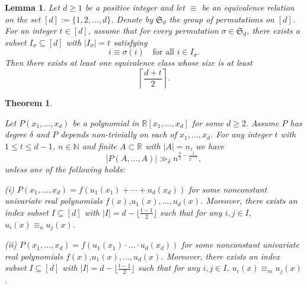 \documentclass[10pt,a4paper]{amsart}
\newtheorem{theorem}{Theorem}
\newtheorem{lemma}{Lemma}
\begin{document}
\begin{lemma}\label{lem:counting}
Let $d\geq 1$ be a positive integer and let $\equiv$ be an equivalence relation on the set $[d] := \{1,2,\dots,d\}$.
Denote by $\mathfrak{S}_d$ the group of permutations on $[d]$.
For an integer $t\in [d]$, assume that for every permutation $\sigma \in \mathfrak{S}_d$, there exists a subset
$I_{\sigma}\subseteq [d]$ with $|I_{\sigma}|=t$ satisfying
\[
i\equiv \sigma(i) \quad \text{for all } i\in I_{\sigma}.
\]
Then there exists at least one equivalence class whose size is at least
\[
\left\lceil \frac{d+t}{2} \right\rceil.
\]
\end{lemma}

\begin{theorem}\label{thm:main1} 

Let $P(x_{1},\ldots,x_{d})$ be a polynomial in $ \mathbb{R}[x_{1},\ldots,x_{d}]$  for some $d\geq 2.$ Assume $P$ has degree $ \delta $ and $P$ depends non-trivially on each of $x_1,...,x_d$.  For any integer $t$ with $1\leq t\leq d-1$, $n \in \mathbb{N}$ and finite $A\subset \mathbb{R}$ with $|A|=n$, we have
$$
| P(A,\ldots, A)|\gg_{\delta} n^{\frac{3}{2}-\frac{1}{2^{t+1}}},
$$
unless one of the following holds:

(i) $P(x_{1},\ldots,x_{d})=f( u_{1}(x_{1})+\cdots +u_{d}(x_{d}))$ for some nonconstant univariate real polynomials  $f(x)$,$u_1(x),\ldots,u_{d}(x)$. 
Moreover, there exists an index subset $I\subseteq [d]$ with $|I|=d-\lfloor \frac{t-1}{2} \rfloor$ such that for any $i,j\in I$,  $u_{i}(x)\equiv_{a} u_{j}(x)$.



(ii) $P(x_{1},\ldots,x_{d})=f( u_{1}(x_{1})\cdot\ldots\cdot u_{d}(x_{d}))$ for some nonconstant univariate real polynomials  $f(x)$,$u_1(x),\ldots,u_{d}(x)$. Moreover, there exists an index subset $I\subseteq [d]$ with $|I|=d-\lfloor \frac{t-1}{2} \rfloor$ such that for any $i,j\in I$, $u_{i}(x)\equiv_{m} u_{j}(x)$.




\end{theorem}
\end{document}
